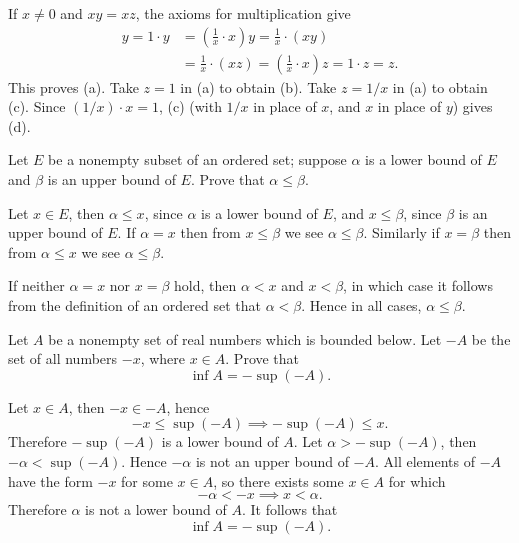 \begin{questions}
  \begin{solution}
    If $x\neq0$ and $xy=xz$, the axioms for multiplication give
    \begin{align*}
      y = 1\cdot y &= \left( \frac{1}{x}\cdot x \right)y = \frac{1}{x}\cdot(xy) \\
                   &= \frac{1}{x}\cdot(xz) = \left(\frac{1}{x}\cdot x\right)z = 1\cdot z = z.
    \end{align*}
    This proves (a). Take $z=1$ in (a) to obtain (b). Take $z=1/x$ in (a) to obtain (c). Since $(1/x)\cdot x=1$, (c) (with $1/x$ in place of $x$, and $x$ in place of $y$) gives (d).
  \end{solution}

  \question Let $E$ be a nonempty subset of an ordered set; suppose $\alpha$ is a lower bound of $E$ and $\beta$ is an upper bound of $E$. Prove that $\alpha\leq\beta$.
  \begin{solution}
    Let $x\in E$, then $\alpha \leq x$, since $\alpha$ is a lower bound of $E$, and $x\leq \beta$, since $\beta$ is an upper bound of $E$. If $\alpha=x$ then from $x\leq\beta$ we see $\alpha\leq\beta$. Similarly if $x=\beta$ then from $\alpha\leq x$ we see $\alpha\leq\beta$.

    If neither $\alpha=x$ nor $x=\beta$ hold, then $\alpha<x$ and $x<\beta$, in which case it follows from the definition of an ordered set that $\alpha<\beta$. Hence in all cases, $\alpha\leq\beta$.
  \end{solution}

  \question Let $A$ be a nonempty set of real numbers which is bounded below. Let $-A$ be the set of all numbers $-x$, where $x\in A$. Prove that
  \[ \inf A = -\sup(-A). \]
  \begin{solution}
    Let $x\in A$, then $-x\in-A$, hence
    \[ -x \leq \sup(-A) \implies -\sup(-A) \leq x. \]
    Therefore $-\sup(-A)$ is a lower bound of $A$. Let $\alpha>-\sup(-A)$, then $-\alpha<\sup(-A)$. Hence $-\alpha$ is not an upper bound of $-A$. All elements of $-A$ have the form $-x$ for some $x\in A$, so there exists some $x\in A$ for which
    \[ -\alpha < -x \implies x < \alpha. \]
    Therefore $\alpha$ is not a lower bound of $A$. It follows that
    \[ \inf A = -\sup(-A). \]
  \end{solution}


\end{questions}

